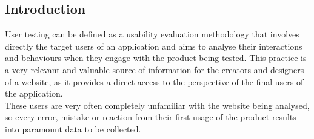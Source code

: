 
\subsection{Introduction}

User testing can be defined as a usability evaluation methodology that involves directly the target users of an application and aims to analyse their interactions and behaviours when they engage with the product being tested.
This practice is a very relevant and valuable source of information for the creators and designers of a website, as it provides a direct access to the perspective of the final users of the application.\\
These users are very often completely unfamiliar with the website being analysed, so every error, mistake or reaction from their first usage of the product results into paramount data to be collected.

